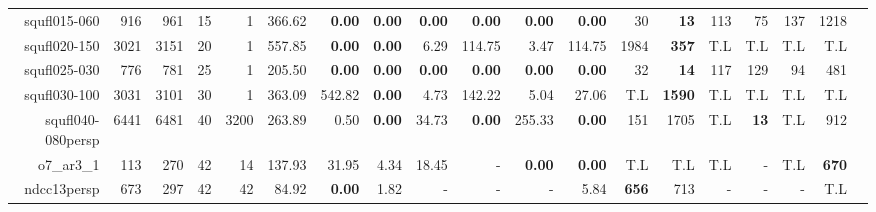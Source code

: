 \begin{table*}[t]
\begin{tabular}{|r|r|r|r|r||r||r|r|r|r|r|r||r|r|r|r|r|r|r|}
                     squfl015-060 &          916 &          961 &           15 &            1 &             366.62 &  \textbf{0.00} & \textbf{0.00} &  \textbf{0.00} &  \textbf{0.00} &  \textbf{0.00} &  \textbf{0.00} &                 30 &        \textbf{13} &                113 &                 75 &         137 &         1218 \\ 
                     squfl020-150 &         3021 &         3151 &           20 &            1 &             557.85 &  \textbf{0.00} & \textbf{0.00} &           6.29 &         114.75 &           3.47 &         114.75 &               1984 &       \textbf{357} &                T.L &                T.L &         T.L &          T.L \\ 
                     squfl025-030 &          776 &          781 &           25 &            1 &             205.50 &  \textbf{0.00} & \textbf{0.00} &  \textbf{0.00} &  \textbf{0.00} &  \textbf{0.00} &  \textbf{0.00} &                 32 &        \textbf{14} &                117 &                129 &          94 &          481 \\ 
                     squfl030-100 &         3031 &         3101 &           30 &            1 &             363.09 &         542.82 & \textbf{0.00} &           4.73 &         142.22 &           5.04 &          27.06 &                T.L &      \textbf{1590} &                T.L &                T.L &         T.L &          T.L \\ 
                squfl040-080persp &         6441 &         6481 &           40 &         3200 &             263.89 &           0.50 & \textbf{0.00} &          34.73 &  \textbf{0.00} &         255.33 &  \textbf{0.00} &                151 &               1705 &                T.L &        \textbf{13} &         T.L &          912 \\ 
                       o7\_ar3\_1 &          113 &          270 &           42 &           14 &             137.93 &          31.95 &          4.34 &          18.45 &              - &  \textbf{0.00} &  \textbf{0.00} &                T.L &                T.L &                T.L &                  - &         T.L & \textbf{670} \\ 
                      ndcc13persp &          673 &          297 &           42 &           42 &              84.92 &  \textbf{0.00} &          1.82 &              - &              - &              - &           5.84 &       \textbf{656} &                713 &                  - &                  - &           - &          T.L \\ 

\end{tabular}
\end{table*}
